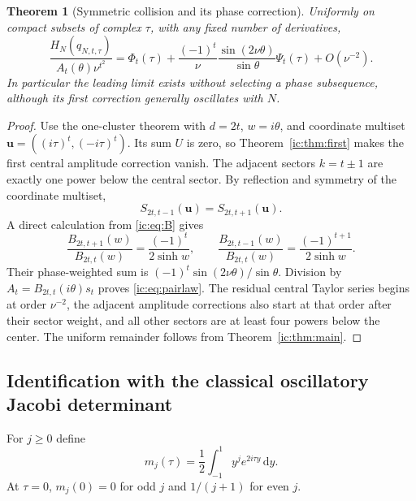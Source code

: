 \documentclass[11pt,a4paper]{article}
\numberwithin{equation}{section}
\newtheorem{theorem}{Theorem}[section]
\theoremstyle{definition}
\theoremstyle{remark}
\newcommand{\dd}{\mathrm d}
\newcommand{\bu}{\boldsymbol u}
\begin{document}
\begin{theorem}[Symmetric collision and its phase correction]
\label{ic:thm:pair}
Uniformly on compact subsets of complex $\tau$, with any fixed number of
derivatives,
\begin{equation}\label{ic:eq:pairlaw}
 \frac{H_N(q_{N,t,\tau})}{A_t(\theta)\nu^{t^2}}
 =\Phi_t(\tau)+
 \frac{(-1)^t}{\nu}\frac{\sin(2\nu\theta)}{\sin\theta}\Psi_t(\tau)
 +O(\nu^{-2}).
\end{equation}
In particular the leading limit exists without selecting a phase
subsequence, although its first correction generally oscillates with $N$.
\end{theorem}
\begin{proof}
Use the one-cluster theorem with $d=2t$, $w=i\theta$, and coordinate
multiset $\bu=((i\tau)^t,(-i\tau)^t)$. Its sum $U$ is zero, so
Theorem~\ref{ic:thm:first} makes the first central amplitude correction
vanish. The adjacent sectors $k=t\pm1$ are exactly one power below the
central sector. By reflection and symmetry of the coordinate multiset,
\[
 S_{2t,t-1}(\bu)=S_{2t,t+1}(\bu).
\]
A direct calculation from \eqref{ic:eq:B} gives
\[
 \frac{B_{2t,t+1}(w)}{B_{2t,t}(w)}
   =\frac{(-1)^t}{2\sinh w},\qquad
 \frac{B_{2t,t-1}(w)}{B_{2t,t}(w)}
   =\frac{(-1)^{t+1}}{2\sinh w}.
\]
Their phase-weighted sum is
$(-1)^t\sin(2\nu\theta)/\sin\theta$. Division by
$A_t=B_{2t,t}(i\theta)s_t$ proves \eqref{ic:eq:pairlaw}. The residual
central Taylor series begins at order $\nu^{-2}$, the adjacent amplitude
corrections also start at that order after their sector weight, and all
other sectors are at least four powers below the center. The uniform
remainder follows from Theorem~\ref{ic:thm:main}.
\end{proof}

\subsection{Identification with the classical oscillatory Jacobi determinant}
For $j\ge0$ define
\begin{equation}\label{ic:eq:oscillmom}
 m_j(\tau)=\frac12\int_{-1}^1y^j e^{2i\tau y}\,\dd y.
\end{equation}
At $\tau=0$, $m_j(0)=0$ for odd $j$ and $1/(j+1)$ for even $j$.
\end{document}

